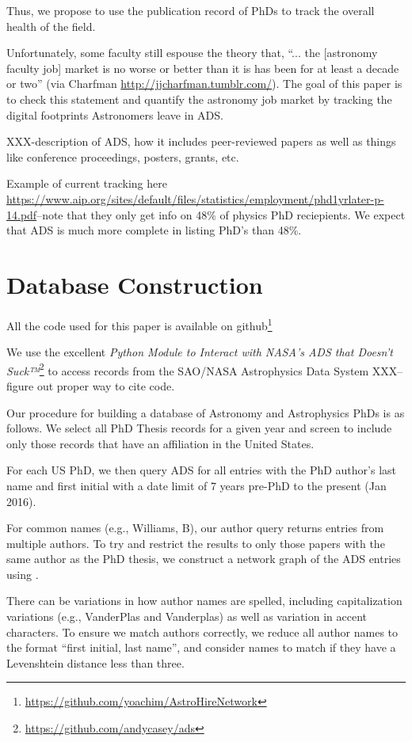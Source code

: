 \documentclass{emulateapj}
\begin{document}
Thus, we propose to use the publication record of PhDs to track the overall health of the field.  

Unfortunately, some faculty still espouse the theory that, ``... the [astronomy faculty job] market is no worse or better than it is has been for at least a decade or two'' (via Charfman \url{http://jjcharfman.tumblr.com/}).  The goal of this paper is to check this statement and quantify the astronomy job market by tracking the digital footprints Astronomers leave in ADS. 

XXX-description of ADS, how it includes peer-reviewed papers as well as things like conference proceedings, posters, grants, etc.

Example of current tracking here \url{https://www.aip.org/sites/default/files/statistics/employment/phd1yrlater-p-14.pdf}--note that they only get info on 48\% of physics PhD reciepients.  We expect that ADS is much more complete in listing PhD's than 48\%.


\section{Database Construction}\label{sec:db_construct}

All the code used for this paper is available on github\footnote{\url{https://github.com/yoachim/AstroHireNetwork}}

We use the excellent {\emph{Python Module to Interact with NASA's ADS that Doesn't Suck™}}\footnote{\url{https://github.com/andycasey/ads}} to access records from the SAO/NASA Astrophysics Data System XXX--figure out proper way to cite code. 

Our procedure for building a database of Astronomy and Astrophysics PhDs is as follows.  We select all PhD Thesis records for a given year and screen to include only those records that have an affiliation in the United States.

For each US PhD, we then query ADS for all entries with the PhD author's last name and first initial with a date limit of 7 years pre-PhD to the present (Jan 2016).

For common names (e.g.,  Williams, B), our author query returns entries from multiple authors.  To try and restrict the results to only those papers with the same author as the PhD thesis, we construct a network graph of the ADS entries using \citet{networkx}.

There can be variations in how author names are spelled, including capitalization variations (e.g., VanderPlas and Vanderplas) as well as variation in accent characters.  To ensure we match authors correctly, we reduce all author names to the format ``first initial, last name'', and consider names to match if they have a Levenshtein distance less than three.
\end{document}
